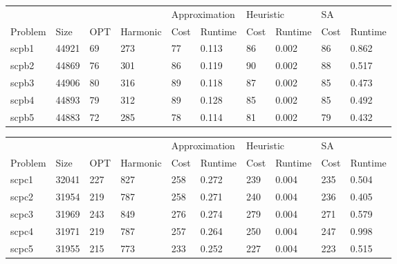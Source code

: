 \begin{table}[]
\centering
\begin{tabular}{@{}llllllllll@{}}
\toprule
        &       &     &          & \multicolumn{2}{l}{Approximation} & \multicolumn{2}{l}{Heuristic} & \multicolumn{2}{l}{SA} \\
Problem & Size  & OPT & Harmonic & Cost           & Runtime          & Cost         & Runtime        & Cost     & Runtime     \\ \midrule
scpb1   & 44921 & 69  & 273      & 77             & 0.113            & 86           & 0.002          & 86       & 0.862       \\
scpb2   & 44869 & 76  & 301      & 86             & 0.119            & 90           & 0.002          & 88       & 0.517       \\
scpb3   & 44906 & 80  & 316      & 89             & 0.118            & 87           & 0.002          & 85       & 0.473       \\
scpb4   & 44893 & 79  & 312      & 89             & 0.128            & 85           & 0.002          & 85       & 0.492       \\
scpb5   & 44883 & 72  & 285      & 78             & 0.114            & 81           & 0.002          & 79       & 0.432       \\ \bottomrule
\end{tabular}
\end{table}

\begin{table}[]
\centering
\begin{tabular}{@{}llllllllll@{}}
\toprule
        &       &     &          & \multicolumn{2}{l}{Approximation} & \multicolumn{2}{l}{Heuristic} & \multicolumn{2}{l}{SA} \\
Problem & Size  & OPT & Harmonic & Cost           & Runtime          & Cost         & Runtime        & Cost     & Runtime     \\ \midrule
scpc1   & 32041 & 227 & 827      & 258            & 0.272            & 239          & 0.004          & 235      & 0.504       \\
scpc2   & 31954 & 219 & 787      & 258            & 0.271            & 240          & 0.004          & 236      & 0.405       \\
scpc3   & 31969 & 243 & 849      & 276            & 0.274            & 279          & 0.004          & 271      & 0.579       \\
scpc4   & 31971 & 219 & 787      & 257            & 0.264            & 250          & 0.004          & 247      & 0.998       \\
scpc5   & 31955 & 215 & 773      & 233            & 0.252            & 227          & 0.004          & 223      & 0.515       \\ \bottomrule
\end{tabular}
\end{table}

